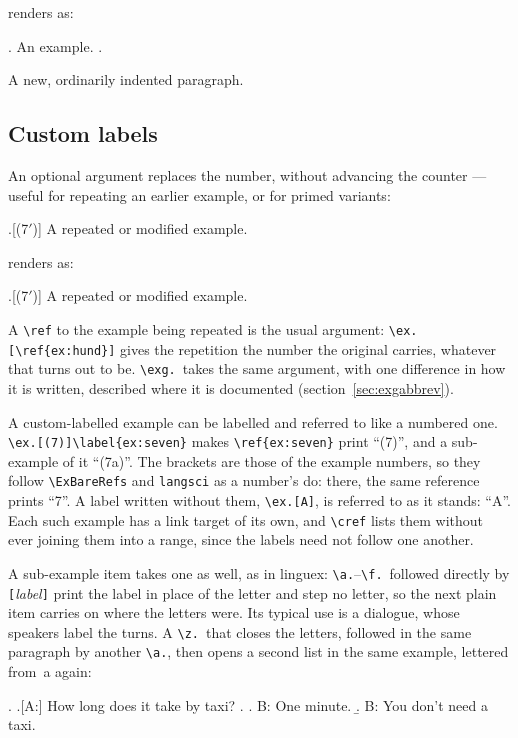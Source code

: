 \documentclass[11pt,a4paper]{article}
\newcommand{\cs}[1]{\texttt{\textbackslash #1}}
\newcommand{\pkg}[2][]{\textsf{#2}}
\newcommand{\opt}[1]{\texttt{#1}}
\newcommand{\meta}[1]{\textrm{\itshape\textlangle#1\textrangle}}
\newcommand{\oarg}[1]{\penalty300 \texttt{[}\meta{#1}\texttt{]}}
\newcommand{\rendered}{\par\medskip\noindent\textcolor{gray!70}{\small renders as:}\par\nobreak\smallskip}
\newcommand{\afterex}{\par\addvspace{\medskipamount}}
\begin{document}
\rendered
\ex. An example. \z.

A new, ordinarily indented paragraph.

\afterex

\subsection{Custom labels}\label{sec:customlabels}

An optional argument replaces the number, without advancing the counter ---
useful for repeating an earlier example, or for primed variants:

\begin{code}
\ex.[(7$'$)] A repeated or modified example.
\end{code}

\rendered
\ex.[(7$'$)] A repeated or modified example.

\afterex
\noindent A \cs{ref} to the example being repeated is the usual argument:
\cs{ex.}\texttt{[\textbackslash ref\{ex:hund\}]} gives the repetition the
number the original carries, whatever that turns out to be.
\cs{exg.}\ takes the same argument, with one difference in how it is
written, described where it is documented (section~\ref{sec:exgabbrev}).

A custom-labelled example can be labelled and referred to like a numbered
one. \cs{ex.}\texttt{[(7)]\textbackslash label\{ex:seven\}} makes
\cs{ref}\texttt{\{ex:seven\}} print ``(7)'', and a sub-example of it
``(7a)''. The brackets are those of the example numbers, so they follow
\cs{ExBareRefs} and \opt{langsci} as a number's do: there, the same
reference prints ``7''. A label written without them, \cs{ex.}\texttt{[A]},
is referred to as it stands: ``A''. Each such example has a link target
of its own, and \cs{cref} lists them without ever joining them into a
range, since the labels need not follow one another.

A sub-example item takes one as well, as in \pkg{linguex}: \cs{a.}--\cs{f.}\
followed directly by \oarg{label} print the label in place of the letter
and step no letter, so the next plain item carries on where the letters
were. Its typical use is a dialogue, whose speakers label the turns. A
\cs{z.}\ that closes the letters, followed in the same paragraph by
another \cs{a.}, then opens a second list in the same example, lettered
from~a again:

\begin{code}
\ex. \a.[A:] How long does it take by taxi?
\z.
\a. B: One minute.
\b. B: You don't need a taxi.
\end{code}
\end{document}

